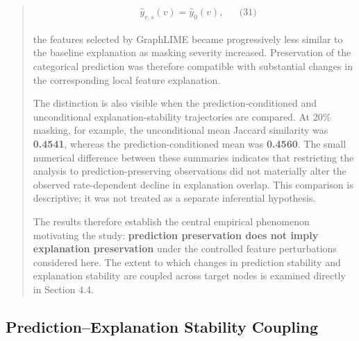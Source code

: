 \documentclass[a4paper]{article}
\begin{document}
\begin{quote}
\[\begin{matrix}
 & {\widehat{y}}_{r,s}(v) = {\widehat{y}}_{0}(v), & & \text{(31)}
\end{matrix}
\]

the features selected by GraphLIME became progressively less similar to
the baseline explanation as masking severity increased. Preservation of
the categorical prediction was therefore compatible with substantial
changes in the corresponding local feature explanation.

The distinction is also visible when the prediction-conditioned and
unconditional explanation-stability trajectories are compared. At 20\%
masking, for example, the unconditional mean Jaccard similarity was
\textbf{0.4541}, whereas the prediction-conditioned mean was
\textbf{0.4560}. The small numerical difference between these summaries
indicates that restricting the analysis to prediction-preserving
observations did not materially alter the observed rate-dependent
decline in explanation overlap. This comparison is descriptive; it was
not treated as a separate inferential hypothesis.

The results therefore establish the central empirical phenomenon
motivating the study: \textbf{prediction preservation does not imply
explanation preservation} under the controlled feature perturbations
considered here. The extent to which changes in prediction stability and
explanation stability are coupled across target nodes is examined
directly in Section 4.4.
\end{quote}

\subsection{Prediction--Explanation Stability
Coupling}\label{predictionexplanation-stability-coupling}
\end{document}
